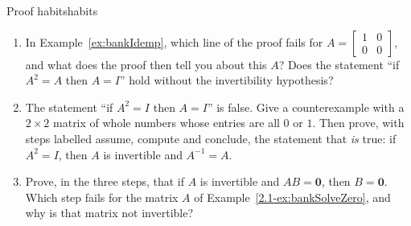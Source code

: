 \documentclass[11pt]{article}
\begin{document}
\begin{think}{Proof habits}{habits}
\begin{enumerate}[label=(\arabic*)]
  \item In Example~\ref{ex:bankIdemp}, which line of the proof fails for $A=\begin{bmatrix}1&0\\0&0\end{bmatrix}$, and what does the proof then tell you about this $A$? Does the statement ``if $A^2=A$ then $A=I$'' hold without the invertibility hypothesis?
  \item The statement ``if $A^2=I$ then $A=I$'' is false. Give a counterexample with a $2\times2$ matrix of whole numbers whose entries are all $0$ or $1$. Then prove, with steps labelled assume, compute and conclude, the statement that \emph{is} true: if $A^2=I$, then $A$ is invertible and $A^{-1}=A$.
  \item Prove, in the three steps, that if $A$ is invertible and $AB=\mathbf{0}$, then $B=\mathbf{0}$. Which step fails for the matrix $A$ of Example~\ref{2.1-ex:bankSolveZero}, and why is that matrix not invertible?
\end{enumerate}
\end{think}
\end{document}
